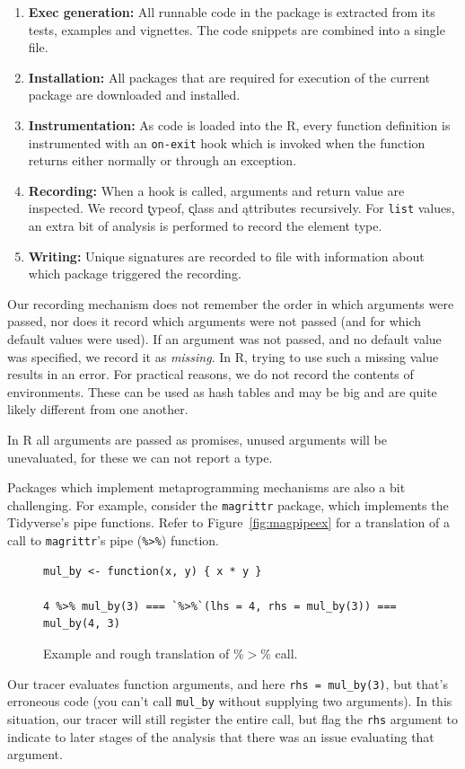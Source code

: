 \documentclass[acmsmall,10pt,review,anonymous]{acmart}\settopmatter{printfolios=true,printccs=false,printacmref=false}
\newcommand{\code}[1]{\lstinline|#1|\xspace}
\begin{document}
\begin{enumerate}
\item {\bf Exec generation:} All runnable code in the package is extracted
  from its tests, examples and vignettes. The code snippets are combined
  into a single file.
\item {\bf Installation:} All packages that are required for execution of
  the current package are downloaded and installed.
\item {\bf Instrumentation:} As code is loaded into the R, every function
  definition is instrumented with an \code{on-exit} hook which is invoked
  when the function returns either normally or through an exception.
\item {\bf Recording:} When a hook is called, arguments and return value are
  inspected. We record \k{typeof}, \k{class} and \k{attributes} recursively.
  For \code{list} values, an extra bit of analysis is performed to record
  the element type.
\item {\bf Writing:} Unique signatures are recorded to file with information
  about which package triggered the recording.
\end{enumerate}

Our recording mechanism does not remember the order in which arguments were
passed, nor does it record which arguments were not passed (and for which
default values were used). If an argument was not passed, and no default
value was specified, we record it as \emph{missing}. In R, trying to use
such a missing value results in an error. For practical reasons, we do not
record the contents of environments. These can be used as hash tables and
may be big and are quite likely different from one another.

In R all arguments are passed as promises, unused arguments will be
unevaluated, for these we can not report a type. 

Packages which implement metaprogramming mechanisms are also a bit challenging.
For example, consider the {\tt magrittr} package, which implements the Tidyverse's pipe functions.
Refer to Figure~\ref{fig:magpipeex} for a translation of a call to {\tt magrittr}'s pipe ({\tt \%>\%}) function.
\begin{figure}[!hb]{\small\begin{lstlisting}[style=R]
mul_by <- function(x, y) { x * y }

4 %>% mul_by(3) === `%>%`(lhs = 4, rhs = mul_by(3)) === mul_by(4, 3)
\end{lstlisting}}\caption{Example and rough translation of \%$>$\% call.}\label{fig:realex}\end{figure}
Our tracer evaluates function arguments, and here \code{rhs = mul_by(3)}, but that's erroneous code (you can't call {\tt mul\_by} without supplying two arguments).
In this situation, our tracer will still register the entire call, but flag the {\tt rhs} argument to indicate to later stages of the analysis that there was an issue evaluating that argument.
\end{document}
